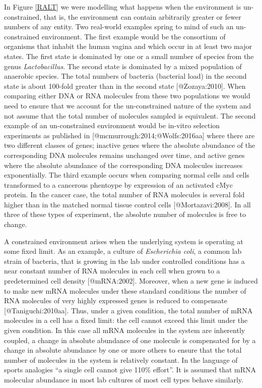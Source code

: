 \documentclass[
  onecolumn]{article}
\begin{document}
In Figure \ref{RALT} we were modelling what happens when the environment is un-constrained, that is, the environment can contain arbitrarily greater or fewer numbers of any entity. Two real-world examples spring to mind of such an un-constrained environment. The first example would be the consortium of organisms that inhabit the human vagina and which occur in at least two major states. The first state is dominated by one or a small number of species from the genus \emph{Lactobacillus}. The second state is dominated by a mixed population of anaerobic species. The total numbers of bacteria (bacterial load) in the second state is about 100-fold greater than in the second state {[}@Zozaya:2010{]}. When comparing either DNA or RNA molecules from these two populations we would need to ensure that we account for the un-constrained nature of the system and not assume that the total number of molecules sampled is equivalent. The second example of an un-constrained environment would be in-vitro selection experiments as published in {[}@mcmurrough:2014;@Wolfs:2016aa{]} where there are two different classes of genes; inactive genes where the absolute abundance of the corresponding DNA molecules remains unchanged over time, and active genes where the absolute abundance of the corresponding DNA molecules increases exponentially. The third example occurs when comparing normal cells and cells transformed to a cancerous phentoype by expression of an activated cMyc protein. In the cancer case, the total number of RNA molecules is several fold higher than in the matched normal tissue control cells {[}@Mortazavi:2008{]}. In all three of these types of experiment, the absolute number of molecules is free to change.

A constrained environment arises when the underlying system is operating at some fixed limit. As an example, a culture of \emph{Escherichia coli}, a common lab strain of bacteria, that is growing in the lab under controlled conditions has a near constant number of RNA molecules in each cell when grown to a predetermined cell density {[}@mRNA:2002{]}. Moreover, when a new gene is induced to make new mRNA molecules under these standard conditions the number of RNA molecules of very highly expressed genes is reduced to compensate {[}@Taniguchi:2010aa{]}. Thus, under a given condition, the total number of mRNA molecules in a cell has a fixed limit: the cell cannot exceed this limit under the given condition. In this case all mRNA molecules in the system are inherently coupled, a change in absolute abundance of one molecule is compensated for by a change in absolute abundance by one or more others to ensure that the total number of molecules in the system is relatively constant. In the language of sports analogies ``a single cell cannot give 110\% effort''. It is assumed that mRNA molecular abundance in most lab cultures of most cell types behave similarly.
\end{document}

